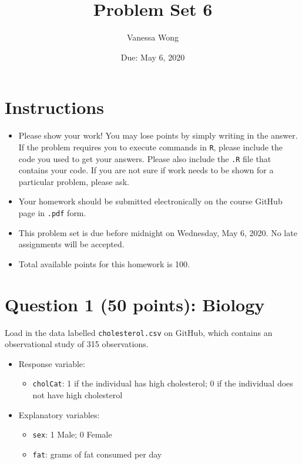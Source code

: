 \documentclass[12pt,letterpaper]{article}
\title{Problem Set 6}
\date{Due: May 6, 2020}
\author{Vanessa Wong}
\begin{document}
	\maketitle
	
	\section*{Instructions}
	\begin{itemize}
		\item Please show your work! You may lose points by simply writing in the answer. If the problem requires you to execute commands in \texttt{R}, please include the code you used to get your answers. Please also include the \texttt{.R} file that contains your code. If you are not sure if work needs to be shown for a particular problem, please ask.
		\item Your homework should be submitted electronically on the course GitHub page in \texttt{.pdf} form.
		\item This problem set is due before midnight on Wednesday, May 6, 2020. No late assignments will be accepted.
		\item Total available points for this homework is 100.
	\end{itemize}
	
	\vspace{.5cm}
\section*{Question 1 (50 points): Biology}
\vspace{.25cm}
\noindent Load in the data labelled \texttt{cholesterol.csv} on GitHub, which contains an observational study of 315 observations.

\begin{itemize}
	\item
	Response variable: 
	\begin{itemize}
		\item \texttt{cholCat}: 1 if the individual has high cholesterol; 0 if the individual does not have high cholesterol
	\end{itemize}
	\item
	Explanatory variables: 
	\begin{itemize}
		\item
		\texttt{sex}: 1 Male; 0 Female
		\item
		\texttt{fat}: grams of fat consumed per day
		
	\end{itemize}
	
\end{itemize}
\end{document}
